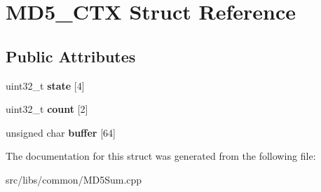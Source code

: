 \section{MD5\_\-CTX Struct Reference}
\label{structMD5__CTX}
\subsection*{Public Attributes}
\begin{DoxyCompactItemize}
\item 
uint32\_\-t {\bfseries state} [4]\label{structMD5__CTX_a7c74e43c2762f66bf81f0075bff2dba2}

\item 
uint32\_\-t {\bfseries count} [2]\label{structMD5__CTX_a652deaea6cce73f3adf6b2212240c351}

\item 
unsigned char {\bfseries buffer} [64]\label{structMD5__CTX_a2da73ecf544745f58211e998719f367f}

\end{DoxyCompactItemize}


The documentation for this struct was generated from the following file:\begin{DoxyCompactItemize}
\item 
src/libs/common/MD5Sum.cpp\end{DoxyCompactItemize}
